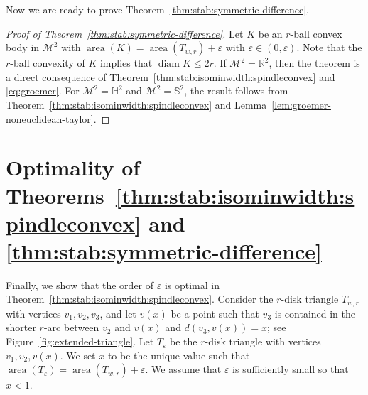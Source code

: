 \documentclass[12pt,reqno]{amsart}
\theoremstyle{remark}
\newcommand{\R}{{\mathbb R}}
\newcommand{\hyp}{{\mathbb H}}
\newcommand{\sph}{{\mathbb S}}
\newcommand{\M}{\mathcal{M}}
\DeclareMathOperator{\diam}{\mathrm{diam}}
\DeclareMathOperator{\area}{\mathrm{area}}
\begin{document}
Now we are ready to prove Theorem~\ref{thm:stab:symmetric-difference}.
\begin{proof}[Proof of Theorem~\ref{thm:stab:symmetric-difference}]
Let $K$ be an $r$-ball convex body in $\M^2$ with $\area (K)=\area (T_{w,r})+\varepsilon$ with $\varepsilon\in (0,\overline{\varepsilon})$. Note that the $r$-ball convexity of $K$ implies that $\diam K\leq 2r$. If $\M^2=\R^2$, then the theorem is a direct consequence of Theorem~\ref{thm:stab:isominwidth:spindleconvex} and \eqref{eq:groemer}. For $\M^2=\hyp^2$ and $\M^2=\sph^2$, the result follows from Theorem~\ref{thm:stab:isominwidth:spindleconvex} and Lemma~\ref{lem:groemer-noneuclidean-taylor}.
\end{proof}

\section{Optimality of Theorems~\ref{thm:stab:isominwidth:spindleconvex} and \ref{thm:stab:symmetric-difference}}\label{sec:optimality}

Finally, we show that the order of $\varepsilon$ is optimal in Theorem~\ref{thm:stab:isominwidth:spindleconvex}. Consider the $r$-disk triangle $T_{w,r}$ with vertices $v_1,v_2,v_3$, and let $v(x)$ be a point such that $v_3$ is contained in the shorter $r$-arc between $v_2$ and $v(x)$ and $d(v_3,v(x))=x$; see Figure~\ref{fig:extended-triangle}. Let $T_\varepsilon$ be the $r$-disk triangle with vertices $v_1,v_2,v(x)$. We set $x$ to be the unique value such that $\area(T_\varepsilon)=\area(T_{w,r})+\varepsilon$. We assume that $\varepsilon$ is sufficiently small so that $x<1$.
\end{document}
